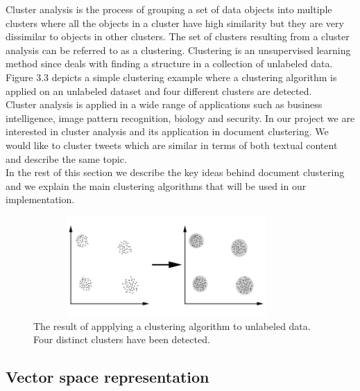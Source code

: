 Cluster analysis is the process of grouping a set of data objects into multiple clusters where all the
objects in a cluster have high similarity but they are very dissimilar to objects in other clusters. The set
of clusters resulting from a cluster analysis can be referred to as a clustering. Clustering is an unsupervised 
learning method since deals with finding a structure in a collection of unlabeled data. Figure 3.3 depicts a simple 
clustering example where a clustering algorithm is applied on an unlabeled dataset and four different clusters are detected.\\
Cluster analysis is applied in a wide range of applications such as business intelligence, image pattern recognition, biology and 
security. In our project we are interested in cluster analysis and its application in document clustering. We would like to cluster tweets 
which are similar in terms of both textual content and describe the same topic.\\
In the rest of this section we describe the key ideas behind document clustering and we explain the main clustering algorithms that
will be used in our implementation.

\begin{figure}[!htbp]
  \begin{center}
    \includegraphics[height=1.5in, width=4in]{clustering}
    \caption{The result of appplying a clustering algorithm to unlabeled data. Four distinct clusters have been detected.}
    \label{ClusteringExample}
  \end{center}
\end{figure} 

\subsection{Vector space representation}

